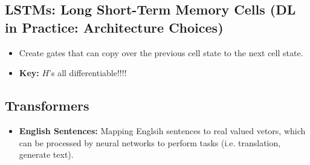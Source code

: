 \subsection{LSTMs: Long Short-Term Memory Cells (DL in Practice: Architecture Choices)}
\begin{summary}
    \begin{itemize}
        \item Create gates that can copy over the previous cell state to the next cell state. 
        \item \textbf{Key:} $H$'s all differentiable!!!!
    \end{itemize}

\end{summary}

\subsection{Transformers}
\begin{summary}
    \begin{itemize}
        \item \textbf{English Sentences:} Mapping Englsih sentences to real valued vetors, which can be processed by neural networks to perform tasks (i.e. translation, generate text).
    \end{itemize}
\end{summary}

